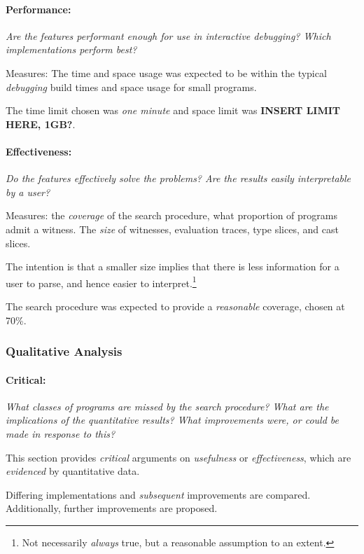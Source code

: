 \paragraph{Performance: } \textit{Are the features performant enough for use in interactive debugging? Which implementations perform best?}

Measures: The time and space usage was expected to be within the typical \textit{debugging} build times and space usage for small programs. 

The time limit chosen was \textit{one minute} and space limit was \textbf{INSERT LIMIT HERE, 1GB?}.

\paragraph{Effectiveness: } \textit{Do the features effectively solve the problems? Are the results easily interpretable by a user?}

Measures: the \textit{coverage} of the search procedure, what proportion of programs admit a witness. The \textit{size} of witnesses, evaluation traces, type slices, and cast slices. 

The intention is that a smaller size implies that there is less information for a user to parse, and hence easier to interpret.\footnote{Not necessarily \textit{always} true, but a reasonable assumption to an extent.}

The search procedure was expected to provide a \textit{reasonable} coverage, chosen at 70\%. 

\subsubsection{Qualitative Analysis}
\paragraph{Critical: } \textit{What \textit{classes} of programs are missed by the search procedure? What are the implications of the \textit{quantitative} results? What improvements were, or could be made in response to this?}

This section provides \textit{critical} arguments on \textit{usefulness} or \textit{effectiveness}, which are \textit{evidenced} by quantitative data. 

Differing implementations and \textit{subsequent} improvements are compared. Additionally, further improvements are proposed.


